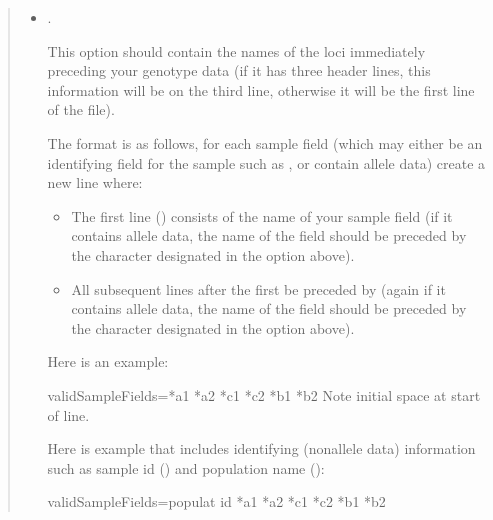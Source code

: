 \documentclass[letterpaper,10pt,english,openany,oneside]{sphinxmanual}
\begin{document}
\label{\detokenize{docs/guide-chapter-usage:validsamplefields}}\begin{quote}
\begin{itemize}
\item {} 
\sphinxAtStartPar
{}.

\sphinxAtStartPar
This option should contain the names of the loci immediately
preceding your genotype data (if it has three header lines, this
information will be on the third line, otherwise it will be the
first line of the file).

\sphinxAtStartPar
The format is as follows, for each sample field (which may either
be an identifying field for the sample such as , or
contain allele data) create a new line where:
\begin{itemize}
\item {} 
\sphinxAtStartPar
The first line () consists of the name of
your sample field (if it contains allele data, the name of the
field should be preceded by the character designated in the
 option above).

\item {} 
\sphinxAtStartPar
All subsequent lines after the first  be preceded by  (again if it contains allele data, the name of the field
should be preceded by the character designated in the
 option above).

\end{itemize}

\sphinxAtStartPar
Here is an example:

\begin{sphinxVerbatim}[commandchars=\\\{\}]
validSampleFields=*a\PYGZus{}1
 *a\PYGZus{}2
 *c\PYGZus{}1
 *c\PYGZus{}2
 *b\PYGZus{}1
 *b\PYGZus{}2    Note initial space at start of line.
\end{sphinxVerbatim}

\sphinxAtStartPar
Here is example that includes identifying (non\sphinxhyphen{}allele data)
information such as sample id () and population name
():

\begin{sphinxVerbatim}[commandchars=\\\{\}]
validSampleFields=populat
 id
 *a\PYGZus{}1
 *a\PYGZus{}2
 *c\PYGZus{}1
 *c\PYGZus{}2
 *b\PYGZus{}1
 *b\PYGZus{}2
\end{sphinxVerbatim}


\end{itemize}
\end{quote}
\end{document}
